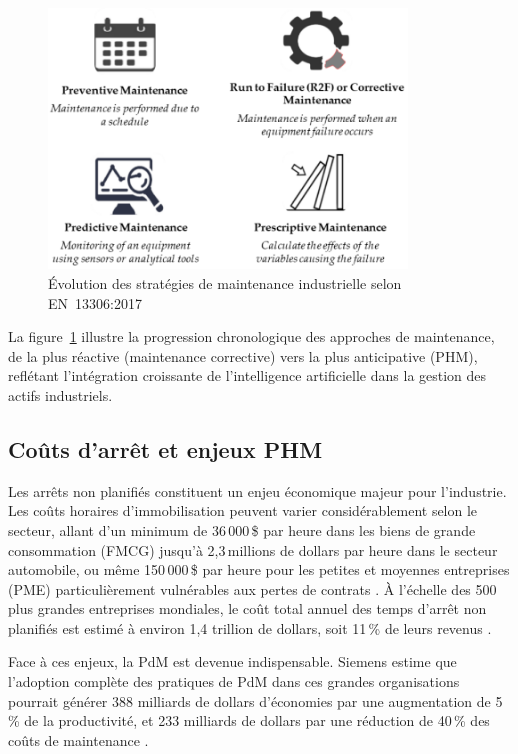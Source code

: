 \begin{figure}[ht]
\centering
\includegraphics[width=0.85\textwidth]{images/maintenance-types.png}
\caption{Évolution des stratégies de maintenance industrielle selon EN~13306:2017 \cite{en13306}}
\label{fig:maintenance_evolution}
\end{figure}

La figure~\ref{fig:maintenance_evolution} illustre la progression chronologique des approches de maintenance, de la plus réactive (maintenance corrective) vers la plus anticipative (PHM), reflétant l'intégration croissante de l'intelligence artificielle dans la gestion des actifs industriels.

\subsection{Coûts d'arrêt et enjeux PHM}

Les arrêts non planifiés constituent un enjeu économique majeur pour l'industrie. Les coûts horaires d'immobilisation peuvent varier considérablement selon le secteur, allant d'un minimum de 36\,000\,\$ par heure dans les biens de grande consommation (FMCG) jusqu'à 2,3\,millions de dollars par heure dans le secteur automobile, ou même 150\,000\,\$ par heure pour les petites et moyennes entreprises (PME) particulièrement vulnérables aux pertes de contrats \cite{siemens2024}. À l'échelle des 500 plus grandes entreprises mondiales, le coût total annuel des temps d'arrêt non planifiés est estimé à environ 1,4 trillion de dollars, soit 11\,\% de leurs revenus \cite{siemens2024}.

Face à ces enjeux, la PdM est devenue indispensable. Siemens estime que l'adoption complète des pratiques de PdM dans ces grandes organisations pourrait générer 388 milliards de dollars d'économies par une augmentation de 5\,\% de la productivité, et 233 milliards de dollars par une réduction de 40\,\% des coûts de maintenance \cite{siemens2024}.

